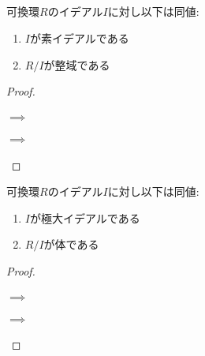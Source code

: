   \subsection{}
  \begin{theorem}
    \label{ring:thm:prime:domain}
    可換環$R$のイデアル$I$に対し以下は同値:
    \begin{enumerate}
    \item
      \label{ring:thm:prime:domain:item:1}
      $I$が素イデアルである
    \item
      \label{ring:thm:prime:domain:item:2}
      $R/I$が整域である
    \end{enumerate}
  \end{theorem}
  \begin{proof}\paragraph{$\implies$}\paragraph{$\implies$}\end{proof}
    


    \begin{theorem}
      \label{ring:thm:maximal:field}
    可換環$R$のイデアル$I$に対し以下は同値:
    \begin{enumerate}
    \item
      \label{ring:thm:maximal:field:item:1}
      $I$が極大イデアルである
    \item
      \label{ring:thm:maximal:field:item:2}
      $R/I$が体である
    \end{enumerate}
  \end{theorem}
  \begin{proof}\paragraph{$\implies$}\paragraph{$\implies$}\end{proof}
    
